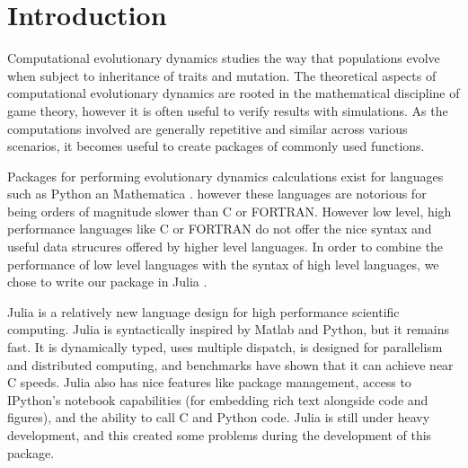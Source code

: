 \section{Introduction}

Computational evolutionary dynamics studies the way that populations evolve when subject to inheritance of traits and mutation.
The theoretical aspects of computational evolutionary dynamics are rooted in the mathematical discipline of game theory, however it is often useful to verify results with simulations.
As the computations involved are generally repetitive and similar across various scenarios, it becomes useful to create packages of commonly used functions.

Packages for performing evolutionary dynamics calculations exist for languages such as Python \cite{pyevodyn} an Mathematica \cite{dynamo}. however these languages are notorious for being orders of magnitude slower than C or FORTRAN.
However low level, high performance languages like C or FORTRAN do not offer the nice syntax and useful data strucures offered by higher level languages.
In order to combine the performance of low level languages with the syntax of high level languages, we chose to write our package in Julia \cite{julia}.

Julia is a relatively new language design for high performance scientific computing.
Julia is syntactically inspired by Matlab and Python, but it remains fast.
It is dynamically typed, uses multiple dispatch, is designed for parallelism and distributed computing, and benchmarks have shown that it can achieve near C speeds.
Julia also has nice features like package management, access to IPython's notebook capabilities (for embedding rich text alongside code and figures), and the ability to call C and Python code.
Julia is still under heavy development, and this created some problems during the development of this package.
